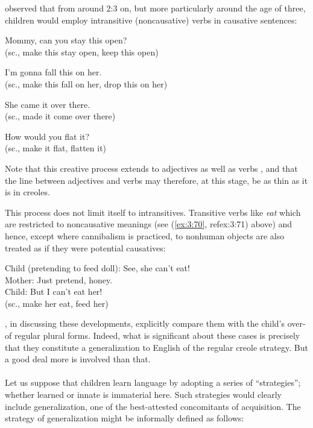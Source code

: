 
\citet{Bowerman1974} observed that from around 2:3 on, but more particularly around the age of three, children would employ intransitive (noncausative) verbs in causative sentences:

\ea\label{ex:3:77}
Mommy, can you stay this open?\\
\glt (sc., make this stay open, keep this open)
\z

\ea\label{ex:3:78}
I'm gonna fall this on her.\\
\glt (sc., make this fall on her, drop this on her) 
\z

\ea\label{ex:3:79}
She came it over there.\\
\glt (sc., made it come over there)
\z

\ea\label{ex:3:80}
How would you flat it?\\
\glt (sc., make it flat, flatten it)
\z

\noindent Note that this creative process extends to adjectives as well as verbs , and that the line between adjectives and verbs may therefore, at this stage, be as thin as it is in creoles.

This process does not limit itself to intransitives. Transitive verbs like \textit{eat} which are restricted to noncausative meanings (see (\ref{ex:3:70}, ref{ex:3:71}) above) and hence, except where cannibalism is practiced, to nonhuman objects are also treated as if they were potential causatives:

\ea\label{ex:3:81}
Child (pretending to feed doll): See, she can't eat!\\
Mother: Just pretend, honey.\\
Child: But I can't eat her!\\
(sc., make her eat, feed her)
\z

\citet[511]{ClarkEtAl1977}, in discussing these developments, explicitly compare them with the child's over- of regular plural forms. Indeed, what is significant about these cases is precisely that they constitute a generalization to English of the regular creole strategy. But a good deal more is involved than that.\\\\

Let us suppose that children learn language by adopting a series of ``strategies''; whether learned or innate is immaterial here. Such
strategies would clearly include generalization, one of the best-attested concomitants of acquisition. The strategy of generalization might be informally defined as follows:

